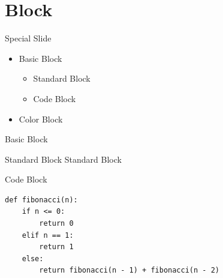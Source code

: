 \documentclass{beamer}
\begin{document}

\section{Block}


\begin{chapter}{}{Special Slide}
\begin{itemize}
\item Basic Block
\begin{itemize}
\item Standard Block
\item Code Block
\end{itemize}
\item Color Block
\end{itemize}
\end{chapter}


\begin{frame}[fragile]{Basic Block}
\begin{block}{Standard Block}
Standard Block
\end{block}
\begin{block}{Code Block}
\begin{verbatim}
def fibonacci(n):
    if n <= 0:
        return 0
    elif n == 1:
        return 1
    else:
        return fibonacci(n - 1) + fibonacci(n - 2)
\end{verbatim}
\end{block}
\end{frame}

\end{document}
